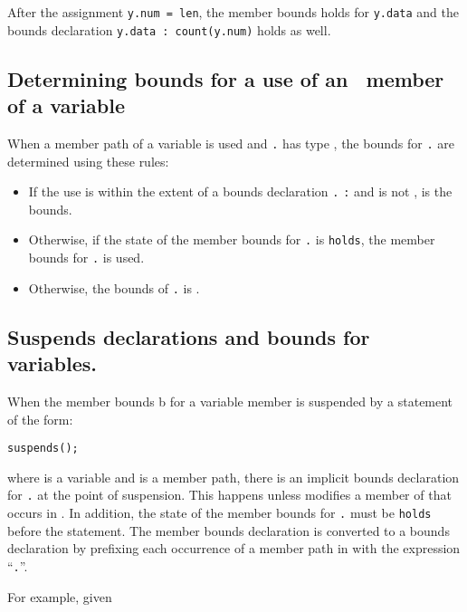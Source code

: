 After the assignment \texttt{y.num = len}, the member bounds holds for
\texttt{y.data} and the bounds declaration \texttt{y.data : count(y.num)}
holds as well.

\subsection{Determining bounds for a use of an \arrayptr\ member of a variable}
\label{section:determining-variable-member-bounds}

When a member path  of a variable  is used and
\texttt{.} has type \arrayptr, the bounds for
\texttt{.} are determined using these rules:

\begin{itemize}
\item
  If the use is within the extent of a bounds declaration
  \texttt{.} \texttt{:}  and
   is not \boundsnone,  is
  the bounds.
\item
  Otherwise, if the state of the member bounds for
  \texttt{.} is \texttt{holds}, the member bounds for
  \texttt{.} is used.
\item
  Otherwise, the bounds of \texttt{.} is
  \boundsnone.
\end{itemize}

\subsection{Suspends declarations and bounds for variables.}

When the member bounds b for a variable member is suspended by a
statement of the form:

  \texttt{suspends(}\texttt{);}

where  is a variable and  is a member path, there is an
implicit bounds declaration for \texttt{.} at the point
of suspension. This happens unless  modifies a member 
of  that occurs in . In addition, the state of the
member bounds for \texttt{.} must be \texttt{holds}
before the statement. The member bounds declaration  is
converted to a bounds declaration by prefixing each occurrence of a
member path in  with the expression ``\texttt{.}''.

For example, given

